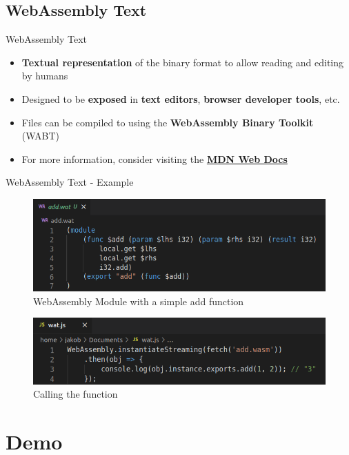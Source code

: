 \documentclass{beamer}
\begin{document}
\subsection{WebAssembly Text}
\begin{frame}[fragile]{WebAssembly Text}
    \begin{itemize}
        \item \textbf{Textual representation} of the binary format to allow reading and editing by humans
        \item Designed to be \textbf{exposed} in \textbf{text editors}, \textbf{browser developer tools}, etc.
        \item Files can be compiled to using the \textbf{WebAssembly Binary Toolkit} (WABT)
        \item For more information, consider visiting the \textbf{\href{https://developer.mozilla.org/en-US/docs/WebAssembly/Understanding_the_text_format}{MDN Web Docs}}
    \end{itemize}
\end{frame}

\begin{frame}{WebAssembly Text - Example}
    \begin{figure}
        \includegraphics[scale=0.3]{./images/wat.png}
        \caption{WebAssembly Module with a simple add function}
    \end{figure}
    \begin{figure}
        \includegraphics[scale=0.3]{./images/watjs.png}
        \caption{Calling the function}
    \end{figure}
\end{frame}

\section{Demo}
\end{document}
